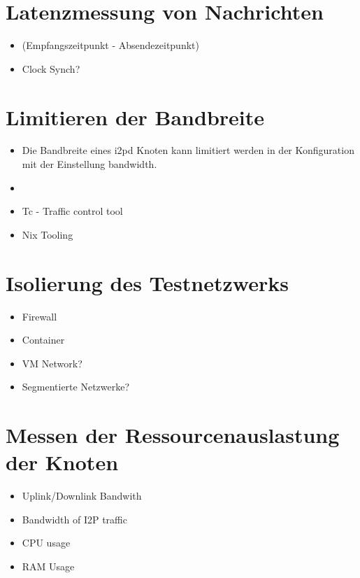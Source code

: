 \section{Latenzmessung von Nachrichten}

\begin{itemize}
    \item (Empfangszeitpunkt - Absendezeitpunkt)
    \item Clock Synch?
\end{itemize}

\section{Limitieren der Bandbreite}

\begin{itemize}
    \item Die Bandbreite eines i2pd Knoten kann limitiert werden in der Konfiguration mit der Einstellung bandwidth.  
    \item \cite{noauthor_i2p_nodate-3}
    \item Tc - Traffic control tool
    \item Nix Tooling
\end{itemize}

\section{Isolierung des Testnetzwerks}

\begin{itemize}
    \item Firewall
    \item Container
    \item VM Network?
    \item Segmentierte Netzwerke?
\end{itemize}

\section{Messen der Ressourcenauslastung der Knoten}

\begin{itemize}
    \item Uplink/Downlink Bandwith
    \item Bandwidth of I2P traffic
    \item CPU usage
    \item RAM Usage
\end{itemize}
